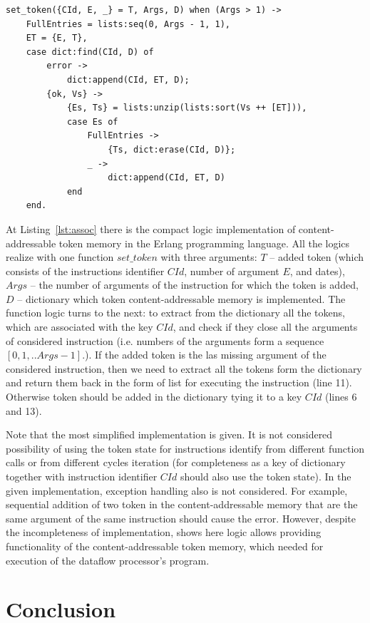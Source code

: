 \documentclass[
11pt,%
tightenlines,%
twoside,%
onecolumn,%
nofloats,%
nobibnotes,%
nofootinbib,%
superscriptaddress,%
noshowpacs,%
centertags]%
{revtex4}
\begin{document}
\begin{lstlisting}[caption={Implementation of the logic of the contest-addressable token memory.},label={lst:assoc}]
set_token({CId, E, _} = T, Args, D) when (Args > 1) ->
	FullEntries = lists:seq(0, Args - 1, 1),
	ET = {E, T},
	case dict:find(CId, D) of
		error ->
			dict:append(CId, ET, D);
		{ok, Vs} ->
			{Es, Ts} = lists:unzip(lists:sort(Vs ++ [ET])),
			case Es of
				FullEntries ->
					{Ts, dict:erase(CId, D)};
				_ ->
					dict:append(CId, ET, D)
			end
	end.
\end{lstlisting}

At Listing~\ref{lst:assoc} there is the compact logic implementation of content-addressable token memory in the Erlang programming language. All the logics realize with one function $set\_token$ with three arguments: $T$ -- added token (which consists of the instructions identifier $CId$, number of argument $E$, and dates), $Args$ -- the number of arguments of the instruction for which the token is added, $D$ -- dictionary which token content-addressable memory is implemented. The function logic turns to the next: to extract from the dictionary all the tokens, which are associated with the key $CId$, and check if they close all the arguments of considered instruction (i.e. numbers of the arguments form a sequence $[0, 1, .. Args - 1]$.). If the added token is the las missing argument of the considered instruction, then we need to extract all the tokens form the dictionary and return them back in the form of list for executing the instruction (line 11). Otherwise token should be added in the dictionary tying it to a key $CId$ (lines 6 and 13).

Note that the most simplified implementation is given. It is not considered possibility of using the token state for instructions identify from different function calls or from different cycles iteration (for completeness as a key of dictionary together with instruction identifier $CId$ should also use the token state). In the given implementation, exception handling also is not considered. For example, sequential addition of two token in the content-addressable memory that are the same argument of the same instruction should cause the error. However, despite the incompleteness of implementation, shows here logic allows providing functionality of the content-addressable token memory, which needed for execution of the dataflow processor’s program.

\section{Conclusion}
\end{document}
